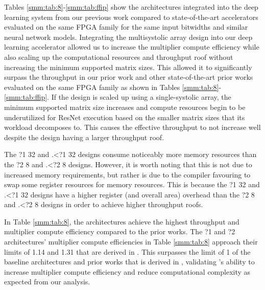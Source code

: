 Tables \ref{smm:tab:8}-\ref{smm:tab:ffip} show the \smmArch architectures  integrated into the deep learning system from our previous work \cite{pogue2024fast} compared to state-of-the-art accelerators evaluated on the same FPGA family for the same input bitwidths and similar neural network models.
Integrating the \smmArch multisystolic array design into our deep learning accelerator allowed us to increase the multiplier compute efficiency while also scaling up the computational resources and throughput roof without increasing the minimum supported matrix sizes.
This allowed it to significantly surpass the throughput in our prior work \cite{pogue2024fast} and other state-of-the-art prior works evaluated on the same FPGA family as shown in Tables \ref{smm:tab:8}-\ref{smm:tab:ffip}.
If the design is scaled up using a single-systolic array, the minimum supported matrix size increases and compute resources begin to be underutilized for ResNet execution based on the smaller matrix sizes that its workload decomposes to.
This causes the effective throughput to not increase well despite the design having a larger throughput roof.

The \smmArch?1 32 and \sAlg.\sffip<{}?1 32 designs consume noticeably more memory resources than the \smmArch?2 8 and \sAlg.\sffip<{}?2 8 designs.
However, it is worth noting that this is not due to increased memory requirements, but rather is due to the compiler favouring to swap some register resources for memory resources.
This is because the \smmArch?1 32 and \sAlg.\sffip<{}?1 32 designs have a higher register (and overall area) overhead than the \smmArch?2 8 and \sAlg.\sffip<{}?2 8 designs in order to achieve higher throughput roofs.

In Table \ref{smm:tab:8}, the \smmArch architectures achieve the highest throughput and multiplier compute efficiency compared to the prior works.
The \smmArch?1 and \smmArch?2 architectures' multiplier compute efficiencies in Table \ref{smm:tab:8} approach their limits of 1.14 and 1.31 that are derived in .
This surpasses the limit of 1 of the baseline \mmArch architectures and prior works that is derived in , validating \smm's ability to increase multiplier compute efficiency and reduce computational complexity as expected from our analysis.

